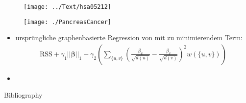 \documentclass{beamer}
\begin{document}
\begin{frame}
\begin{figure}
\centering
\texttt{[image: ../Text/hsa05212]}
\label{fig:hsa05212}
\end{figure}
\end{frame}\caption{}


\begin{frame}
\begin{figure}
\centering
\texttt{[image: ./PancreasCancer]}
\label{fig:pancreas}
\end{figure}
\end{frame}

\begin{frame}
	\begin{itemize}
	\item ursprüngliche graphenbasierte Regression von \cite{li_network-constrained_2008} mit zu minimierendem Term:
	\begin{align*}
	\text{RSS}
	+\gamma_1||\boldsymbol{\beta}||_1
	+\gamma_2 \left( \sum_{\{u,v\}} \left(\frac{\beta_u}{\sqrt{d(u)}}-\frac{\beta_v}{\sqrt{d(v)}}\right)^2 w(\{u,v\})\right)
	\end{align*}
	\item 
	\end{itemize}
\end{frame}





\begin{frame}{Bibliography}


\end{frame}


%
\end{document}
